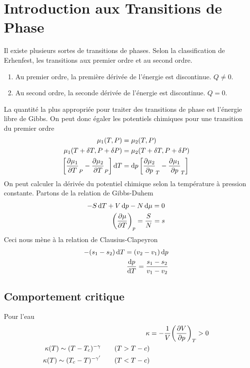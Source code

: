\section{Introduction aux Transitions de Phase} %
\label{sec:Introduction aux Transitions de Phase}

Il existe plusieurs sortes de transitions de phases. Selon la classification
de Erhenfest, les transitions aux premier ordre et au second ordre.
\begin{enumerate}
    \item Au premier ordre, la première dérivée de l'énergie est discontinue.
        $Q\neq0$.
    \item Au second ordre, la seconde dérivée de l'énergie est discontinue.
        $Q=0$.
\end{enumerate}
La quantité la plus appropriée pour traiter des transitions de phase est
l'énergie libre de Gibbs. On peut donc égaler les potentiels chimiques pour
une transition du premier ordre
\begin{align}
    \mu_1(T,P)&=\mu_2(T,P)\\
    \mu_1(T+\delta T,P+\delta P)&=
    \mu_2(T+\delta T,P+\delta P)\\
    \qty[\pdv{\mu_1}{T}_P-\pdv{\mu_2}{T}_P]\dd{T}&=
    \dd{p}\qty[\pdv{\mu_2}{p}_T-\pdv{\mu_1}{p}_T]
\end{align}
On peut calculer la dérivée du potentiel chimique selon la température à
pression constante. Partons de la relation de Gibbs-Duhem
\begin{align}
    -S\dd{T}+V\dd{p}-N\dd{\mu}=0\\
    \qty(\pdv{\mu}{T})_p=\frac{S}{N}=s
\end{align}
Ceci nous mène à la relation de Clausius-Clapeyron
\begin{align}
    -(s_1-s_2)\dd{T}=(v_2-v_1)\dd{p}\\
    \dv{p}{T}=\frac{s_1-s_2}{v_1-v_2}
\end{align}




\subsection{Comportement critique} %
\label{sub:Comportement critique}

Pour l'eau
\begin{align}
    \kappa&=-\frac1V \qty(\pdv{V}{p})_T>0\\
    \kappa(T)\sim (T-T_c)^{-\gamma}\qquad(T>T-c)\\
    \kappa(T)\sim (T_c-T)^{-\gamma'}\qquad(T<T-c)
\end{align}


